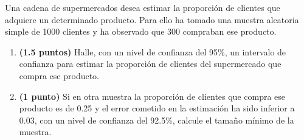 
Una cadena de supermercados desea estimar la proporción de clientes que adquiere un determinado producto. Para ello ha tomado una muestra aleatoria simple de 1000 clientes y ha observado que 300 compraban ese producto.
\begin{enumerate}[label=\alph*)]
\item \textbf{(1.5 puntos)} Halle, con un nivel de confianza del 95\%, un intervalo de confianza para estimar la proporción de clientes del supermercado que compra ese producto.
\item \textbf{(1 punto)} Si en otra muestra la proporción de clientes que compra ese producto es de 0.25 y el error cometido en la estimación ha sido inferior a 0.03, con un nivel de confianza del 92.5\%, calcule el tamaño mínimo de la muestra.
\end{enumerate}
